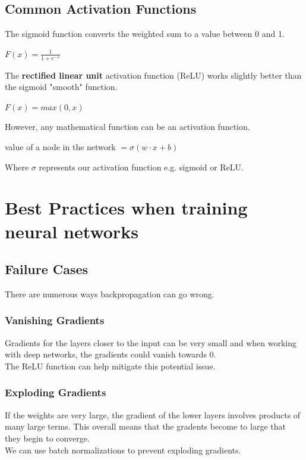 \documentclass[12pt]{article}
\begin{document}
\subsection{Common Activation Functions}

The sigmoid function converts the weighted sum to a value between 0 and 1.
\begin{center}
\begin{LARGE}
$F(x) = \frac{1}{1 + e^{-x}}$
\end{LARGE}
\end{center}
\vspace{1cm}
The \textbf{rectified linear unit} activation function (ReLU) works slightly better than the sigmoid "smooth" function.
\begin{center}
\begin{LARGE}
$F(x) = max(0,x)$
\end{LARGE}
\end{center}
However, any mathematical function can be an activation function.
\begin{center}
\begin{Large}
value of a node in the network $= \sigma(w \cdot x + b)$
\end{Large}
\end{center}
Where $\sigma$ represents our activation function e.g. sigmoid or ReLU.

\section{Best Practices when training neural networks}

\subsection{Failure Cases}

There are numerous ways backpropagation can go wrong.

\subsubsection{Vanishing Gradients}
Gradients for the layers closer to the input can be very small and when working with deep networks, the gradients could vanish towards 0.
\\The ReLU function can help mitigate this potential issue.
\subsubsection{Exploding Gradients}
If the weights are very large, the gradient of the lower layers involves products of many large terms. This overall means that the gradents become to large that they begin to converge.
\\We can use batch normalizations to prevent exploding gradients.
\end{document}
